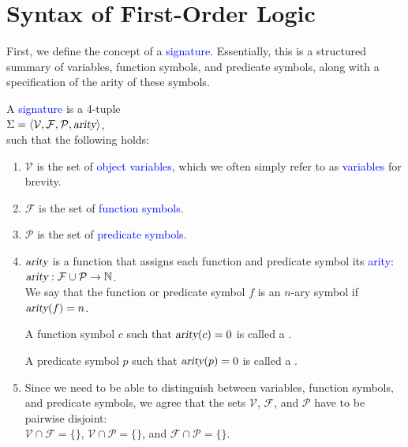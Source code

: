 \section{Syntax of First-Order Logic}
First, we define the concept of a \textcolor{blue}{signature}. Essentially, this is a
structured summary of variables, function symbols, and predicate symbols, along with a specification of the
arity of these symbols. 

\begin{Definition}[Signature]
  A \textcolor{blue}{signature} is a 4-tuple \\[0.2cm]
  \hspace*{1.3cm} $\Sigma = \langle \mathcal{V}, \mathcal{F}, \mathcal{P}, \textsl{arity} \rangle$, \\[0.2cm]
  such that the following holds:
  \begin{enumerate}
  \item $\mathcal{V}$ is the set of \textcolor{blue}{object variables}, which we often simply refer to as
        \textcolor{blue}{variables} for brevity.
  \item $\mathcal{F}$ is the set of \textcolor{blue}{function symbols}.
  \item $\mathcal{P}$ is the set of \textcolor{blue}{predicate symbols}.
  \item $\textsl{arity}$ is a function that assigns each function and predicate symbol its
        \textcolor{blue}{arity}: \\[0.2cm]
        \hspace*{1.3cm} $\textsl{arity}: \mathcal{F} \cup \mathcal{P} \rightarrow \mathbb{N}$. \\[0.2cm]
        We say that the function or predicate symbol $f$ is an
        $n$-ary symbol if $\textsl{arity}(f) = n$.
        
        A function symbol $c$ such that $\textsl{arity}(c) = 0$ is called a . 
        
        A predicate symbol $p$ such that $\textsl{arity}(p) = 0$ is called a .
  \item Since we need to be able to distinguish between variables, function symbols, and predicate symbols,
        we agree that the sets $\mathcal{V}$, $\mathcal{F}$, and $\mathcal{P}$ have to be pairwise disjoint: \\[0.2cm] 
        \hspace*{1.3cm} $\mathcal{V} \cap \mathcal{F} = \{\}$, \quad
                        $\mathcal{V} \cap \mathcal{P} = \{\}$, \quad and \quad
                        $\mathcal{F} \cap \mathcal{P} = \{\}$. \eox
  \end{enumerate}
\end{Definition}

